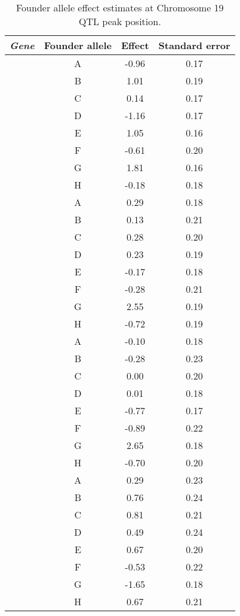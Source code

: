 \documentclass{book}
\begin{document}
\begin{table}[ht]
\caption{Founder allele effect estimates at Chromosome 19 QTL peak position.}\label{tab:effects}
\centering
\begin{tabular}{>{\em}cccc}
  \hline
 Gene & Founder allele & Effect & Standard error \\
  \hline
\multirow{8}{*}{Asah2} & A & -0.96 & 0.17 \\
  & B & 1.01 & 0.19 \\
  & C & 0.14 & 0.17 \\
  & D & -1.16 & 0.17 \\
  & E & 1.05 & 0.16 \\
  & F & -0.61 & 0.20 \\
  & G & 1.81 & 0.16 \\
  & H & -0.18 & 0.18 \\
  \hline
  \multirow{8}{*}{Lipo1} & A & 0.29 & 0.18 \\
  & B & 0.13 & 0.21 \\
  & C & 0.28 & 0.20 \\
  & D & 0.23 & 0.19 \\
  & E & -0.17 & 0.18 \\
  & F & -0.28 & 0.21 \\
  & G & 2.55 & 0.19 \\
  & H & -0.72 & 0.19 \\
  \hline
\multirow{8}{*}{Lipo2} & A & -0.10 & 0.18 \\
  & B & -0.28 & 0.23 \\
  & C & 0.00 & 0.20 \\
  & D & 0.01 & 0.18 \\
  & E & -0.77 & 0.17 \\
  & F & -0.89 & 0.22 \\
  & G & 2.65 & 0.18 \\
  & H & -0.70 & 0.20 \\
   \hline
\multirow{8}{*}{4933413C19Rik} & A & 0.29 & 0.23 \\
  & B & 0.76 & 0.24 \\
  & C & 0.81 & 0.21 \\
  & D & 0.49 & 0.24 \\
  & E & 0.67 & 0.20 \\
  & F & -0.53 & 0.22 \\
  & G & -1.65 & 0.18 \\
  & H & 0.67 & 0.21 \\
   \hline
\end{tabular}
\end{table}
\end{document}

